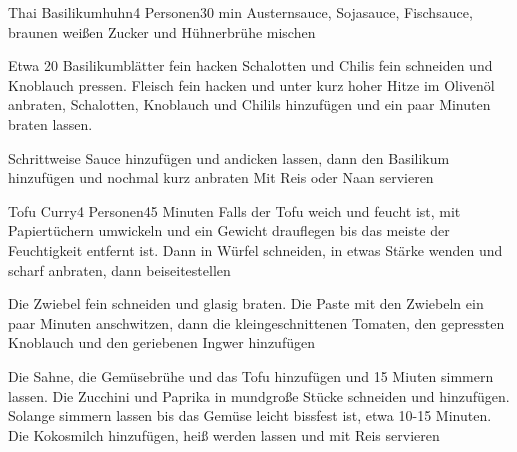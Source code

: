 
\begin{recipe}{Thai Basilikumhuhn}{4 Personen}{30 min}
Austernsauce, Sojasauce, Fischsauce, braunen weißen Zucker und Hühnerbrühe mischen

Etwa 20 Basilikumblätter fein hacken
Schalotten und Chilis fein schneiden und Knoblauch pressen.
Fleisch fein hacken und unter kurz hoher Hitze im Olivenöl anbraten, Schalotten, Knoblauch und Chilils hinzufügen und ein paar Minuten braten lassen.

\ing[]{}{}
Schrittweise Sauce hinzufügen und andicken lassen, dann den Basilikum hinzufügen und nochmal kurz anbraten
Mit Reis oder Naan servieren
\end{recipe}


\begin{recipe}{Tofu Curry}{4 Personen}{45 Minuten}
Falls der Tofu weich und feucht ist, mit Papiertüchern umwickeln und ein Gewicht drauflegen bis das meiste der Feuchtigkeit entfernt ist. Dann in Würfel schneiden, in etwas Stärke wenden und scharf anbraten, dann beiseitestellen

Die Zwiebel fein schneiden und glasig braten.
Die Paste mit den Zwiebeln ein paar Minuten anschwitzen, dann die kleingeschnittenen Tomaten, den gepressten Knoblauch und den geriebenen Ingwer hinzufügen

Die Sahne, die Gemüsebrühe und das Tofu hinzufügen und 15 Miuten simmern lassen.
Die Zucchini und Paprika in mundgroße Stücke schneiden und hinzufügen.
Solange simmern lassen bis das Gemüse leicht bissfest ist, etwa 10-15 Minuten.
Die Kokosmilch hinzufügen, heiß werden lassen und mit Reis servieren
\end{recipe}


